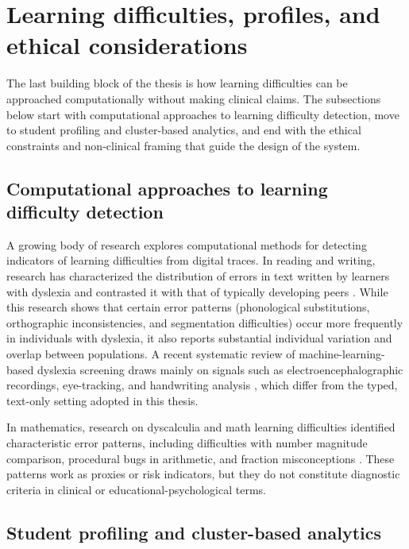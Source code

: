 \section{Learning difficulties, profiles, and ethical considerations}
\label{sec:sota_ethics}

The last building block of the thesis is how learning difficulties can be approached computationally without making clinical claims. The subsections below start with computational approaches to learning difficulty detection, move to student profiling and cluster-based analytics, and end with the ethical constraints and non-clinical framing that guide the design of the system.

\subsection{Computational approaches to learning difficulty detection}
\label{sec:sota_ethics_detect}

A growing body of research explores computational methods for detecting indicators of learning difficulties from digital traces. In reading and writing, research has characterized the distribution of errors in text written by learners with dyslexia and contrasted it with that of typically developing peers \parencite{ShaywitzShaywitz2005,RelloBaezaYates2014}. While this research shows that certain error patterns (phonological substitutions, orthographic inconsistencies, and segmentation difficulties) occur more frequently in individuals with dyslexia, it also reports substantial individual variation and overlap between populations. A recent systematic review of machine-learning-based dyslexia screening draws mainly on signals such as electroencephalographic recordings, eye-tracking, and handwriting analysis \parencite{JanKhan2023}, which differ from the typed, text-only setting adopted in this thesis.

In mathematics, research on dyscalculia and math learning difficulties identified characteristic error patterns, including difficulties with number magnitude comparison, procedural bugs in arithmetic, and fraction misconceptions \parencite{VanLehn1990,BrownBurton1978}. These patterns work as proxies or risk indicators, but they do not constitute diagnostic criteria in clinical or educational-psychological terms.

\subsection{Student profiling and cluster-based analytics}
\label{sec:sota_ethics_profiles}

